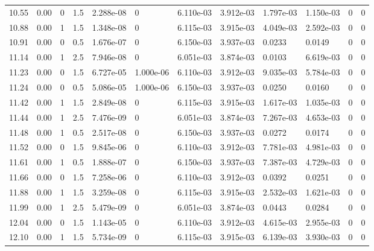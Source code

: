 \documentclass[preview]{standalone}
\begin{document}
{{{\begin{tabular}{L{1.2cm}C{1.2cm} C{0.3cm}C{0.5cm} C{1.4cm}C{1.4cm} C{1.4cm}C{1.4cm} C{1.6cm}C{1.6cm} C{1.6cm}C{1.6cm}}
  10.55  &  0.00  & 0     & 1.5 &  2.288e-08  & 0  &  6.110e-03&   3.912e-03& 1.797e-03 & 1.150e-03   &  0 & 0  \\ 
  10.88  &  0.00  & 1     & 1.5 &  1.348e-08  & 0  &  6.115e-03&   3.915e-03& 4.049e-03 & 2.592e-03   &  0 & 0  \\ 
  10.91  &  0.00  & 0     & 0.5 &  1.676e-07  & 0  &  6.150e-03&   3.937e-03& 0.0233 & 0.0149   &  0 & 0  \\ 
  11.14  &  0.00  & 1     & 2.5 &  7.946e-08  & 0  &  6.051e-03&   3.874e-03& 0.0103 & 6.619e-03   &  0 & 0  \\ 
  11.23  &  0.00  & 0     & 1.5 &  6.727e-05  & 1.000e-06  &  6.110e-03&   3.912e-03& 9.035e-03 & 5.784e-03   &  0 & 0  \\ 
  11.24  &  0.00  & 0     & 0.5 &  5.086e-05  & 1.000e-06  &  6.150e-03&   3.937e-03& 0.0250 & 0.0160   &  0 & 0  \\ 
  11.42  &  0.00  & 1     & 1.5 &  2.849e-08  & 0  &  6.115e-03&   3.915e-03& 1.617e-03 & 1.035e-03   &  0 & 0  \\ 
  11.44  &  0.00  & 1     & 2.5 &  7.476e-09  & 0  &  6.051e-03&   3.874e-03& 7.267e-03 & 4.653e-03   &  0 & 0  \\ 
  11.48  &  0.00  & 1     & 0.5 &  2.517e-08  & 0  &  6.150e-03&   3.937e-03& 0.0272 & 0.0174   &  0 & 0  \\ 
  11.52  &  0.00  & 0     & 1.5 &  9.845e-06  & 0  &  6.110e-03&   3.912e-03& 7.781e-03 & 4.981e-03   &  0 & 0  \\ 
  11.61  &  0.00  & 1     & 0.5 &  1.888e-07  & 0  &  6.150e-03&   3.937e-03& 7.387e-03 & 4.729e-03   &  0 & 0  \\ 
  11.66  &  0.00  & 0     & 1.5 &  7.258e-06  & 0  &  6.110e-03&   3.912e-03& 0.0392 & 0.0251   &  0 & 0  \\ 
  11.88  &  0.00  & 1     & 1.5 &  3.259e-08  & 0  &  6.115e-03&   3.915e-03& 2.532e-03 & 1.621e-03   &  0 & 0  \\ 
  11.99  &  0.00  & 1     & 2.5 &  5.479e-09  & 0  &  6.051e-03&   3.874e-03& 0.0443 & 0.0284   &  0 & 0  \\ 
  12.04  &  0.00  & 0     & 1.5 &  1.143e-05  & 0  &  6.110e-03&   3.912e-03& 4.615e-03 & 2.955e-03   &  0 & 0  \\ 
  12.10  &  0.00  & 1     & 1.5 &  5.734e-09  & 0  &  6.115e-03&   3.915e-03& 6.139e-03 & 3.930e-03   &  0 & 0  \\ 
\hline 
\end{tabular} 

}}}
\end{document}

